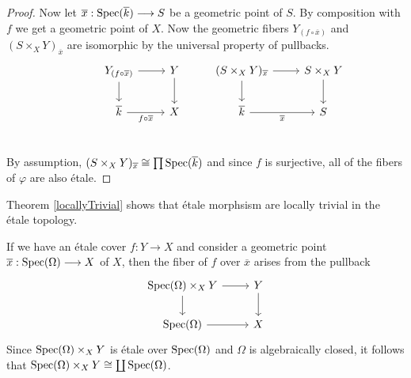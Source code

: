 \begin{proof}
	Now let $\overline{x} : \operatorname{Spec}(\overline{k}) \longrightarrow S$ be a geometric point of $S$. By composition with $f$ we get a geometric point of $X$. Now the geometric fibers $Y_{(f \circ \overline{x})}$ and $(S \times_X Y)_{\overline{x}}$  are isomorphic by the universal property of pullbacks.
	\[
		\begin{tikzcd}
			& {Y_{(f \circ \overline{x})}} & Y & {(S \times_X Y)_{\overline{x}}} & {S \times_X Y} \\
			& {\overline{k}} & X & {\overline{k}} & S \\
			{}
			\arrow[from=1-3, to=2-3]
			\arrow[from=1-2, to=1-3]
			\arrow["{f \circ \overline{x}}"', from=2-2, to=2-3]
			\arrow[from=1-2, to=2-2]
			\arrow[from=1-4, to=2-4]
			\arrow[from=1-4, to=1-5]
			\arrow[from=1-5, to=2-5]
			\arrow["{\overline{x}}"', from=2-4, to=2-5]
		\end{tikzcd}
	\]
	By assumption, $(S\times_X Y)_{\overline{x}} \cong \prod \operatorname{Spec}(\overline{k})$ and since $f$ is surjective, all of the fibers of $\varphi$ are also \'etale.
\end{proof}
Theorem \ref{locallyTrivial} shows that \'etale morphsism are locally trivial in the \'etale topology.

\begin{remark}
	If we have an \'etale cover $f: Y \to X$ and consider a geometric point $\overline{x} : \operatorname{Spec}(\Omega) \longrightarrow X$ of $X$, then the fiber of $f$ over $\overline{x}$ arises from the pullback
	\[\begin{tikzcd}
			{\Spec(\Omega)\times_X Y} & Y \\
			{\Spec(\Omega)} & X
			\arrow[from=1-1, to=2-1]
			\arrow[from=1-1, to=1-2]
			\arrow[from=1-2, to=2-2]
			\arrow[from=2-1, to=2-2]
		\end{tikzcd}\]
	Since $\operatorname{Spec}(\Omega)\times_X Y$ is \'etale over $\operatorname{Spec}(\Omega)$ and $\Omega$ is algebraically closed, it follows that $\operatorname{Spec}(\Omega)\times_X Y \cong \coprod \operatorname{Spec}(\Omega)$.
\end{remark}

